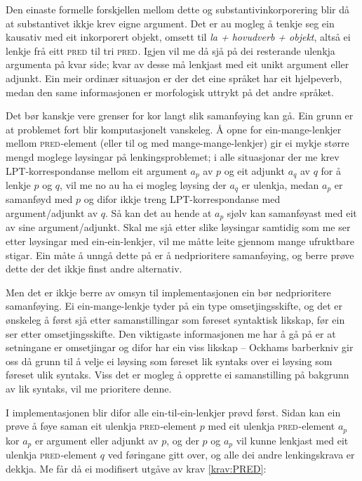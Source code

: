 \documentclass[12pt,a4paper,oneside,draft]{report}
\newcommand{\F}[2]{\textsc{#1}\ensuremath{_{#2}}}
\newcommand{\PRED}{\F{pred}{}}
\begin{document}
Den einaste formelle forskjellen mellom dette og
 substantivinkorporering blir då at substantivet ikkje krev eigne
 argument.  Det er au mogleg å tenkje seg ein kausativ med eit
 inkorporert objekt, omsett til \emph{la + hovudverb + objekt}, altså ei
 lenkje frå eitt \PRED{} til tri \PRED{}. Igjen vil me då sjå på dei
 resterande ulenkja argumenta på kvar side; kvar av desse må lenkjast
 med eit unikt argument eller adjunkt. Ein meir ordinær situasjon er
 der det eine språket har eit hjelpeverb, medan den same informasjonen
 er morfologisk uttrykt på det andre språket.

Det bør kanskje vere grenser for kor langt slik samanføying kan
 gå. Ein grunn er at problemet fort blir komputasjonelt vanskeleg. Å
 opne for ein-mange-lenkjer mellom \PRED{}-element (eller til og med
 mange-mange-lenkjer) gir ei mykje større mengd moglege løysingar på
 lenkingsproblemet; i alle situasjonar der me krev LPT\hyp{}korrespondanse
 mellom eit argument $a_p$ av $p$ og eit adjunkt $a_q$ av $q$ for å
 lenkje $p$ og $q$, vil me no au ha ei mogleg løysing der $a_q$ er
 ulenkja, medan $a_p$ er samanføyd med $p$ og difor ikkje treng
 LPT\hyp{}korrespondanse med argument/adjunkt av $q$. Så kan det au hende
 at $a_p$ sjølv kan samanføyast med eit av sine argument/adjunkt. Skal
 me sjå etter slike løysingar samtidig som me ser etter løysingar med
 ein-ein-lenkjer, vil me måtte leite gjennom mange ufruktbare
 stigar. Ein måte å unngå dette på er å nedprioritere samanføying, og
 berre prøve dette der det ikkje finst andre alternativ.

Men det er ikkje berre av omsyn til implementasjonen ein bør
 nedprioritere samanføying. Ei ein-mange-lenkje tyder på ein type
 omsetjingsskifte, og det er ønskeleg å først sjå etter
 samanstillingar som føreset syntaktisk likskap, før ein ser etter
 omsetjingsskifte. Den viktigaste informasjonen me har å gå på er at
 setningane er omsetjingar og difor har ein viss likskap -- Ockhams
 barberkniv gir oss då grunn til å velje ei løysing som føreset lik
 syntaks over ei løysing som føreset ulik syntaks. Viss det er mogleg
 å opprette ei samanstilling på bakgrunn av lik syntaks, vil me
 prioritere denne.

I implementasjonen blir difor alle ein-til-ein-lenkjer prøvd
 først. Sidan kan ein prøve å føye saman eit ulenkja \PRED{}-element
 $p$ med eit ulenkja \PRED{}-element $a_p$ kor $a_p$ er argument eller
 adjunkt av $p$, og der $p$ og $a_p$ vil kunne lenkjast med eit
 ulenkja \PRED{}-element $q$ ved føringane gitt over, og alle dei
 andre lenkingskrava er dekkja. Me får då ei modifisert utgåve av
 krav \ref{krav:PRED}:
\end{document}
